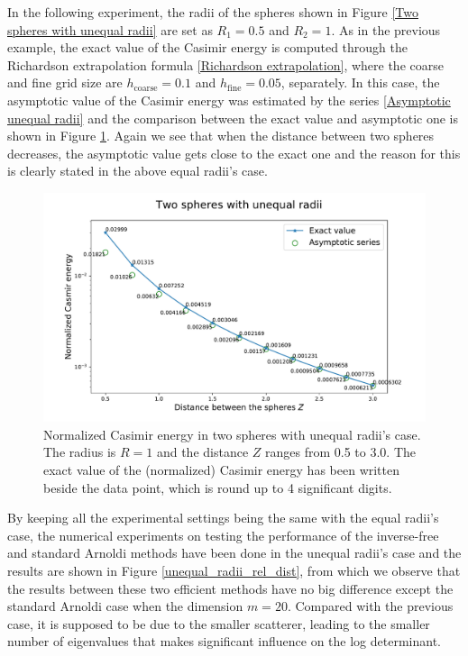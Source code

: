 In the following experiment, the radii of the spheres shown in Figure \ref{Two spheres with unequal radii} are set as $R_{1} = 0.5$ and $ R_{2} = 1$. 
As in the previous example, the exact value of the Casimir energy is computed through the Richardson extrapolation formula \eqref{Richardson extrapolation}, 
where the coarse and fine grid size are $h_{\text{coarse}} = 0.1$ and $h_{\text{fine}} = 0.05$, separately. In this case, the asymptotic value of the Casimir 
energy was estimated by the series \eqref{Asymptotic unequal radii} and the comparison between the exact value and asymptotic one is shown in Figure 
\ref{Casimir energy between spheres with unequal radii}. Again we see that when the distance between two spheres decreases, the asymptotic value gets 
close to the exact one and the reason for this is clearly stated in the above equal radii's case.
\begin{figure}[H]
    \includegraphics[scale = 0.7]{figures/Spheres_unequal_CasE.pdf}
    \caption{Normalized Casimir energy in two spheres with unequal radii's case. The radius is $R = 1$ and the distance $Z$ 
    ranges from 0.5 to 3.0. The exact value of the (normalized) Casimir energy has been written 
    beside the data point, which is round up to 4 significant digits.}
    \label{Casimir energy between spheres with unequal radii}
\end{figure}

By keeping all the experimental settings being the same with the equal radii's case, the numerical experiments on testing the performance of the inverse-free and 
standard Arnoldi methods have been done in the unequal radii's case and the results are shown in Figure \ref{unequal_radii_rel_dist}, from which we observe that 
the results between these two efficient methods have no big difference except the standard Arnoldi case when the dimension $m = 20$.  Compared with the previous
case, it is supposed to be due to the smaller scatterer, leading to the smaller number of eigenvalues that makes significant influence on the log determinant.

